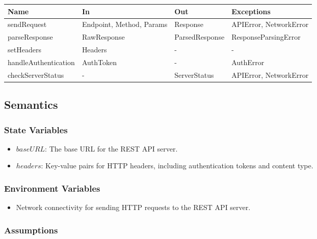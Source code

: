 \documentclass[12pt, titlepage]{article}
\begin{document}
\begin{center}
  \begin{tabular}{p{5cm} p{4cm} p{3cm} p{3cm}}
    \hline
    \textbf{Name}        & \textbf{In}              & \textbf{Out}   & \textbf{Exceptions}    \\
    \hline
    sendRequest          & Endpoint, Method, Params & Response       & APIError, NetworkError \\
    parseResponse        & RawResponse              & ParsedResponse & ResponseParsingError   \\
    setHeaders           & Headers                  & -              & -                      \\
    handleAuthentication & AuthToken                & -              & AuthError              \\
    checkServerStatus    & -                        & ServerStatus   & APIError, NetworkError \\
    \hline
  \end{tabular}
\end{center}

\subsection{Semantics}

\subsubsection{State Variables}

\begin{itemize}
  \item \( baseURL \): The base URL for the REST API server.
  \item \( headers \): Key-value pairs for HTTP headers, including authentication tokens and content type.
\end{itemize}

\subsubsection{Environment Variables}

\begin{itemize}
  \item Network connectivity for sending HTTP requests to the REST API server.
\end{itemize}

\subsubsection{Assumptions}
\end{document}
